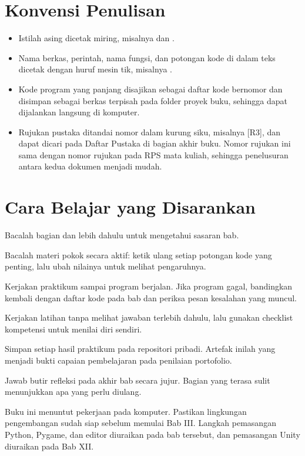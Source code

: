 \section*{Konvensi Penulisan}

\begin{itemize}
  \item Istilah asing dicetak miring, misalnya  dan
        .
  \item Nama berkas, perintah, nama fungsi, dan potongan kode di dalam teks
        dicetak dengan huruf mesin tik, misalnya .
  \item Kode program yang panjang disajikan sebagai daftar kode bernomor
        dan disimpan sebagai berkas terpisah pada folder  proyek
        buku, sehingga dapat dijalankan langsung di komputer.
  \item Rujukan pustaka ditandai nomor dalam kurung siku, misalnya
        \mbox{[R3]}, dan dapat dicari pada Daftar Pustaka di bagian akhir
        buku. Nomor rujukan ini sama dengan nomor rujukan pada RPS mata
        kuliah, sehingga penelusuran antara kedua dokumen menjadi mudah.
\end{itemize}

\section*{Cara Belajar yang Disarankan}

\begin{langkah}
  \item Bacalah bagian  dan  lebih dahulu untuk mengetahui sasaran bab.
  \item Bacalah materi pokok secara aktif: ketik ulang setiap potongan kode
        yang penting, lalu ubah nilainya untuk melihat pengaruhnya.
  \item Kerjakan praktikum sampai program berjalan. Jika program gagal,
        bandingkan kembali dengan daftar kode pada bab dan periksa pesan
        kesalahan yang muncul.
  \item Kerjakan latihan tanpa melihat jawaban terlebih dahulu, lalu
        gunakan checklist kompetensi untuk menilai diri sendiri.
  \item Simpan setiap hasil praktikum pada repositori pribadi. Artefak
        inilah yang menjadi bukti capaian pembelajaran pada penilaian
        portofolio.
  \item Jawab butir refleksi pada akhir bab secara jujur. Bagian yang terasa
        sulit menunjukkan apa yang perlu diulang.
\end{langkah}

\begin{catatabox}
Buku ini menuntut pekerjaan pada komputer. Pastikan lingkungan
pengembangan sudah siap sebelum memulai Bab III. Langkah pemasangan
Python, Pygame, dan editor diuraikan pada bab tersebut, dan pemasangan
Unity diuraikan pada Bab XII.
\end{catatabox}

\clearpage
